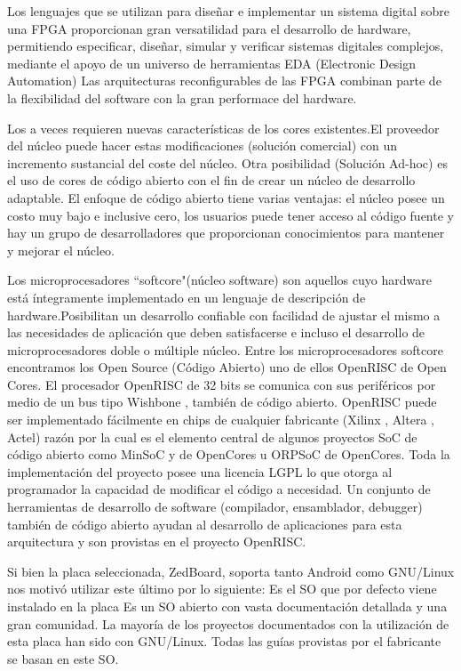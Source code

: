 Los lenguajes que se utilizan para diseñar e implementar un sistema digital sobre una FPGA proporcionan gran versatilidad para el desarrollo de hardware, permitiendo especificar, diseñar, simular y verificar sistemas digitales complejos, mediante el apoyo de un universo de herramientas EDA (Electronic Design Automation)
Las arquitecturas reconfigurables de las FPGA combinan parte de la flexibilidad del software con la gran performace del hardware.

Los  a veces requieren nuevas características de los cores existentes.El proveedor del núcleo puede hacer estas modificaciones (solución comercial) con un incremento sustancial del coste del núcleo. Otra posibilidad (Solución Ad-hoc) es el uso de cores de código abierto con el fin de crear un núcleo de desarrollo adaptable. El enfoque de código abierto tiene varias ventajas: el núcleo posee un costo muy bajo e inclusive cero, los usuarios puede tener acceso al código fuente y hay un grupo de desarrolladores que proporcionan conocimientos para mantener y mejorar el núcleo.

Los microprocesadores “softcore"(núcleo software) son aquellos cuyo hardware está íntegramente implementado en un lenguaje de descripción de hardware.Posibilitan un desarrollo confiable con facilidad de ajustar el mismo a las necesidades de aplicación que deben satisfacerse e incluso el desarrollo de microprocesadores doble o múltiple núcleo.
Entre los microprocesadores softcore encontramos los Open Source (Código Abierto) uno de ellos OpenRISC de Open Cores.
El procesador OpenRISC de 32 bits se comunica con sus periféricos por medio de un bus tipo Wishbone , también de código abierto. OpenRISC puede ser implementado
fácilmente en chips de cualquier fabricante (Xilinx , Altera , Actel) razón por la cual es el elemento central de algunos proyectos SoC de código abierto como MinSoC y 
de OpenCores u ORPSoC de OpenCores. 
Toda la implementación del proyecto posee una licencia LGPL lo que otorga al programador la capacidad de modificar el código a necesidad. Un conjunto de herramientas de desarrollo de software (compilador, ensamblador, debugger) también de código abierto ayudan al desarrollo de aplicaciones para esta arquitectura y son provistas en el proyecto OpenRISC.

Si bien la placa seleccionada, ZedBoard, soporta tanto Android como GNU/Linux nos motivó utilizar este último por lo siguiente:
Es el SO que por defecto viene instalado en la placa
Es un SO abierto con vasta documentación detallada y una gran comunidad.
La mayoría de los proyectos documentados con la utilización de esta placa han sido con GNU/Linux.
Todas las guías provistas por el fabricante se basan en este SO.

